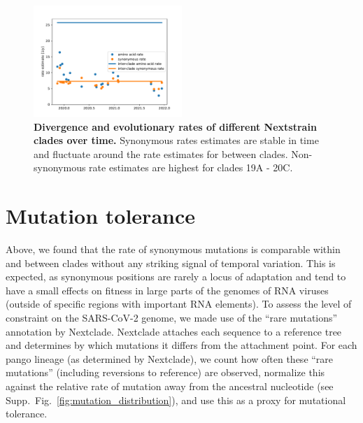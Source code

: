 \documentclass[aps,rmp, twocolumn]{revtex4}
\begin{document}
\begin{figure}
    \includegraphics[width=0.5\textwidth]{figures/rate_progression.pdf}
    \caption{{\bf Divergence and evolutionary rates of different Nextstrain clades over time.} Synonymous rates estimates are stable in time and fluctuate around the rate estimates for between clades. Non-synonymous rate estimates are highest for clades 19A - 20C.
    \label{fig:rate_progression} }
\end{figure}




\section*{Mutation tolerance}

Above, we found that the rate of synonymous mutations is comparable within and between clades without any striking signal of temporal variation.
This is expected, as synonymous positions are rarely a locus of adaptation and tend to have a small effects on fitness in large parts of the genomes of RNA viruses \citep{zanini_vivo_2017} (outside of specific regions with important RNA elements).
To assess the level of constraint on the SARS-CoV-2 genome, we made use of the ``rare mutations'' annotation by Nextclade.
Nextclade attaches each sequence to a reference tree and determines by which mutations it differs from the attachment point.
For each pango lineage (as determined by Nextclade), we count how often these ``rare mutations'' (including reversions to reference) are observed, normalize this against the relative rate of mutation away from the ancestral nucleotide (see Supp.~Fig.~\ref{fig:mutation_distribution}), and use this as a proxy for mutational tolerance.
\end{document}
